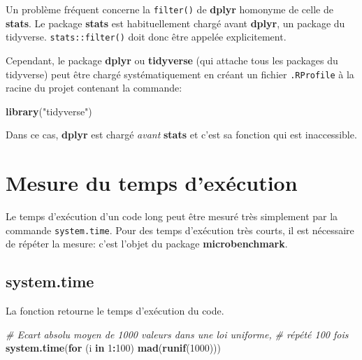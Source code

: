 \documentclass[
  12pt,
  french,
  a4paper,
  extrafontsizes,onecolumn,openright
  ]{memoir}
\newenvironment{Shaded}{\begin{snugshade}}{\end{snugshade}}
\newcommand{\CommentTok}[1]{\textcolor[rgb]{0.56,0.35,0.01}{\textit{#1}}}
\newcommand{\ControlFlowTok}[1]{\textcolor[rgb]{0.13,0.29,0.53}{\textbf{#1}}}
\newcommand{\DecValTok}[1]{\textcolor[rgb]{0.00,0.00,0.81}{#1}}
\newcommand{\KeywordTok}[1]{\textcolor[rgb]{0.13,0.29,0.53}{\textbf{#1}}}
\newcommand{\NormalTok}[1]{#1}
\newcommand{\OperatorTok}[1]{\textcolor[rgb]{0.81,0.36,0.00}{\textbf{#1}}}
\newcommand{\StringTok}[1]{\textcolor[rgb]{0.31,0.60,0.02}{#1}}
\begin{document}
Un problème fréquent concerne la \texttt{filter()} de \textbf{dplyr} homonyme de celle de \textbf{stats}.
Le package \textbf{stats} est habituellement chargé avant \textbf{dplyr}, un package du tidyverse.
\texttt{stats::filter()} doit donc être appelée explicitement.

Cependant, le package \textbf{dplyr} ou \textbf{tidyverse} (qui attache tous les packages du tidyverse) peut être chargé systématiquement en créant un fichier \texttt{.RProfile} à la racine du projet contenant la commande:

\scriptsize

\begin{Shaded}
\begin{Highlighting}[]
\KeywordTok{library}\NormalTok{(}\StringTok{"tidyverse"}\NormalTok{)}
\end{Highlighting}
\end{Shaded}

\normalsize

Dans ce cas, \textbf{dplyr} est chargé \emph{avant} \textbf{stats} et c'est sa fonction qui est inaccessible.

\hypertarget{mesure-du-temps-dexuxe9cution}{%
\section{Mesure du temps d'exécution}\label{mesure-du-temps-dexuxe9cution}}

Le temps d'exécution d'un code long peut être mesuré très simplement par la commande \texttt{system.time}.
Pour des temps d'exécution très courts, il est nécessaire de répéter la mesure: c'est l'objet du package \textbf{microbenchmark}.

\hypertarget{system.time}{%
\subsection{system.time}\label{system.time}}

La fonction retourne le temps d'exécution du code.

\scriptsize

\begin{Shaded}
\begin{Highlighting}[]
\CommentTok{# Ecart absolu moyen de 1000 valeurs dans une loi uniforme,}
\CommentTok{# répété 100 fois}
\KeywordTok{system.time}\NormalTok{(}\ControlFlowTok{for}\NormalTok{ (i }\ControlFlowTok{in} \DecValTok{1}\OperatorTok{:}\DecValTok{100}\NormalTok{) }\KeywordTok{mad}\NormalTok{(}\KeywordTok{runif}\NormalTok{(}\DecValTok{1000}\NormalTok{)))}
\end{Highlighting}
\end{Shaded}
\end{document}
